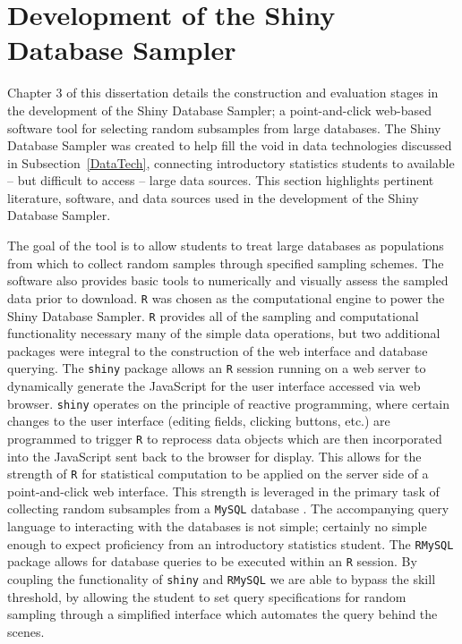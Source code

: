 \documentclass[11pt]{isuthesis}\usepackage[]{graphicx}\usepackage[]{color}
\begin{document}
\section{Development of the Shiny Database Sampler}
\label{ShinyDBSamplerLit}

Chapter 3 of this dissertation details the construction and evaluation stages in the development of the Shiny Database Sampler; a point-and-click web-based software tool for selecting random subsamples from large databases. The Shiny Database Sampler was created to help fill the void in data technologies discussed in Subsection~\ref{DataTech}, connecting introductory statistics students to available -- but difficult to access -- large data sources. This section highlights pertinent literature, software, and data sources used in the development of the Shiny Database Sampler.

The goal of the tool is to allow students to treat large databases as populations from which to collect random samples through specified sampling schemes. The software also provides basic tools to numerically and visually assess the sampled data prior to download. \texttt{R} \citep{R} was chosen as the computational engine to power the Shiny Database Sampler. \texttt{R} provides all of the sampling and computational functionality necessary many of the simple data operations, but two additional packages were integral to the construction of the web interface and database querying. The \texttt{shiny} package \citep{shiny} allows an \texttt{R} session running on a web server to dynamically generate the JavaScript for the user interface accessed via web browser. \texttt{shiny} operates on the principle of reactive programming, where certain changes to the user interface (editing fields, clicking buttons, etc.) are programmed to trigger \texttt{R} to reprocess data objects which are then incorporated into the JavaScript sent back to the browser for display. This allows for the strength of \texttt{R} for statistical computation to be applied on the server side of a point-and-click web interface. This strength is leveraged in the primary task of collecting random subsamples from a \texttt{MySQL} database \citep{MySQL}. The accompanying query language to interacting with the databases is not simple; certainly no simple enough to expect proficiency from an introductory statistics student. The \texttt{RMySQL} package \citep{RMySQL} allows for database queries to be executed within an \texttt{R} session. By coupling the functionality of \texttt{shiny} and \texttt{RMySQL} we are able to bypass the skill threshold, by allowing the student to set query specifications for random sampling through a simplified interface which automates the query behind the scenes. 
\end{document}
